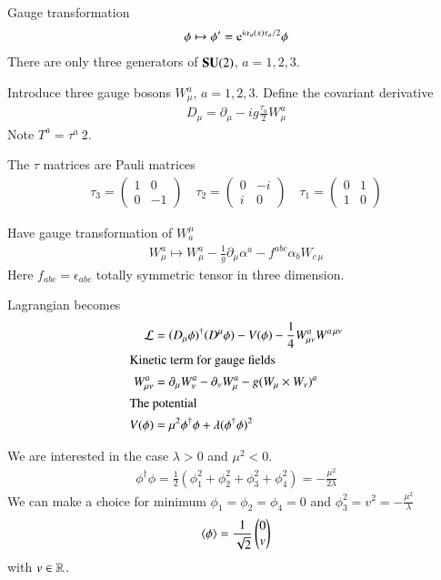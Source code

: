 Gauge transformation
\begin{align}
   \phi \mapsto \phi'=\mathrm{e}^{i\alpha_a(x) \tau_a / 2} \phi
\end{align}
There are only three generators of $\mathbf{SU}(2)$, $a=1,2,3$.

Introduce three gauge bosons $W_\mu^a$, $a=1,2,3$. Define the covariant derivative
\begin{align}
   D_\mu = \partial_\mu - ig \frac{\tau_a}{2} W_\mu^a
\end{align}
Note $T^a = {\tau^a} \ {2}$.

The $\tau$ matrices are Pauli matrices
\begin{align}
   \tau_3 = \begin{pmatrix} 1 & 0 \\ 0 & -1\end{pmatrix}   \quad 
   \tau_2 = \begin{pmatrix} 0 & -i \\ i & 0\end{pmatrix} \quad
   \tau_1  = \begin{pmatrix} 0 & 1 \\ 1 & 0\end{pmatrix} 
\end{align}

Have gauge transformation of $W_a^\mu$
\begin{align}
W_\mu^a \mapsto W_\mu^a - \frac{1}{g} \partial_\mu \alpha^a - f^{abc} \alpha_b W_{c \,\mu} 
\end{align}
Here $f_{abc} = \epsilon_{abc}$ totally symmetric tensor in three dimension.

Lagrangian becomes
\begin{align}
   \mathcal{L} &= (D_\mu \phi)^\dagger (D^\mu \phi) - V(\phi) - \frac{1}{4} W_{\mu\nu}^a W^{a \, \mu\nu} \\
   \shortintertext{Kinetic term for gauge fields}
   W_{\mu\nu}^a &= \partial_\mu W_\nu^a - \partial_\nu W_\mu^a - g (W_\mu \times W_\nu)^a \\
   \shortintertext{The potential}
   V(\phi) &= \mu^2 \phi^\dagger \phi + \lambda (\phi^\dagger \phi)^2
\end{align}

We are interested in the case $\lambda > 0$ and $\mu^2 < 0$.
\begin{align*}
   \phi^\dagger \phi = \frac{1}{2} \left( \phi_1^2 + \phi_2^2 + \phi_3^2 + \phi_4^2 \right) = - \frac{\mu^2}{2\lambda}
\end{align*}
We can make a choice for minimum $\phi_1 = \phi_2 = \phi_4 = 0$ and $\phi_3^2 = v^2 = - \frac{\mu^2}{\lambda}$ 
\begin{align}
   \expval{\phi} = \frac{1}{\sqrt{2}} \begin{pmatrix} 0 \\ v\end{pmatrix}
\end{align}
with $v \in \mathbb{R}$.

